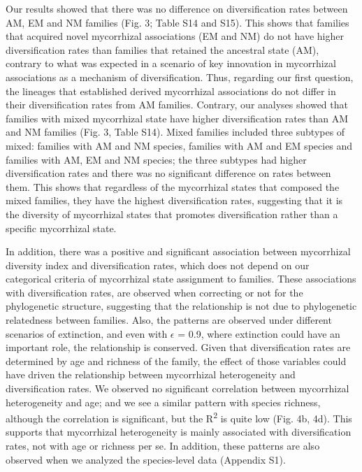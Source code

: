 \documentclass[12pt,]{article}
\begin{document}
Our results showed that there was no difference on diversification rates
between AM, EM and NM families (Fig. 3; Table S14 and S15). This shows
that families that acquired novel mycorrhizal associations (EM and NM)
do not have higher diversification rates than families that retained the
ancestral state (AM), contrary to what was expected in a scenario of key
innovation in mycorrhizal associations as a mechanism of
diversification. Thus, regarding our first question, the lineages that
established derived mycorrhizal associations do not differ in their
diversification rates from AM families. Contrary, our analyses showed
that families with mixed mycorrhizal state have higher diversification
rates than AM and NM families (Fig. 3, Table S14). Mixed families
included three subtypes of mixed: families with AM and NM species,
families with AM and EM species and families with AM, EM and NM species;
the three subtypes had higher diversification rates and there was no
significant difference on rates between them. This shows that regardless
of the mycorrhizal states that composed the mixed families, they have
the highest diversification rates, suggesting that it is the diversity
of mycorrhizal states that promotes diversification rather than a
specific mycorrhizal state.

In addition, there was a positive and significant association between
mycorrhizal diversity index and diversification rates, which does not
depend on our categorical criteria of mycorrhizal state assignment to
families. These associations with diversification rates, are observed
when correcting or not for the phylogenetic structure, suggesting that
the relationship is not due to phylogenetic relatedness between
families. Also, the patterns are observed under different scenarios of
extinction, and even with \(\epsilon\) = 0.9, where extinction could
have an important role, the relationship is conserved. Given that
diversification rates are determined by age and richness of the family,
the effect of those variables could have driven the relationship between
mycorrhizal heterogeneity and diversification rates. We observed no
significant correlation between mycorrhizal heterogeneity and age; and
we see a similar pattern with species richness, although the correlation
is significant, but the R\textsuperscript{2} is quite low (Fig. 4b, 4d).
This supports that mycorrhizal heterogeneity is mainly associated with
diversification rates, not with age or richness per se. In addition,
these patterns are also observed when we analyzed the species-level data
(Appendix S1).
\end{document}
